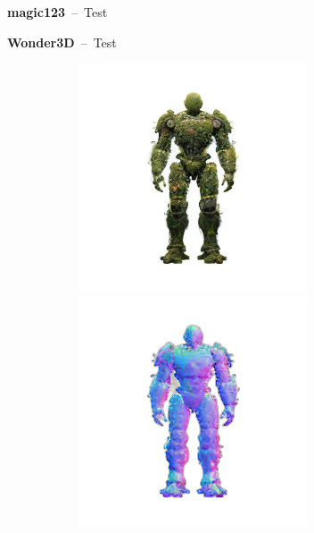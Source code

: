\textbf{magic123}~--~Test

\textbf{Wonder3D}~--~Test

\begin{figure}[ht]
    \centering
    \begin{subfigure}[b]{0.22\textwidth}
        \centering
        \includegraphics[width=\textwidth]{etc/a robot made out of plants/wonder3D/rgb_000_front.png}
        \includegraphics[width=\textwidth]{etc/a robot made out of plants/wonder3D/normals_000_front.png}

\end{subfigure}
\end{figure}
